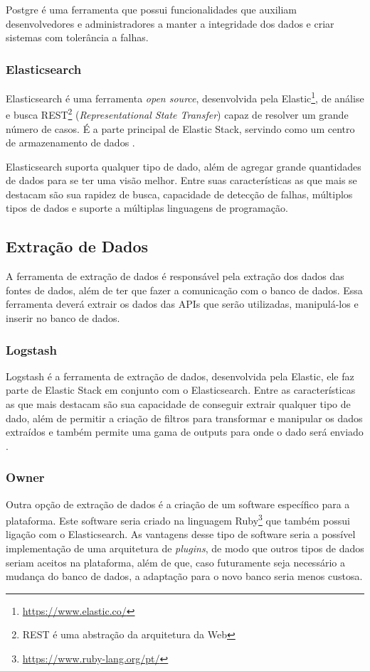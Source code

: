 Postgre é uma ferramenta que possui funcionalidades que auxiliam desenvolvedores e administradores a manter a integridade dos dados e criar sistemas com tolerância a falhas.
\subsubsection*{Elasticsearch}
Elasticsearch é uma ferramenta \textit{open source}, desenvolvida pela Elastic\footnote[2]{\url{https://www.elastic.co/}}, de análise e busca REST\footnote[3]{REST é uma abstração da arquitetura da Web} (\textit{Representational State Transfer}) capaz de resolver um grande número de casos. É a parte principal de Elastic Stack, servindo como um centro de armazenamento de dados \cite{elasticsearch}.

Elasticsearch suporta qualquer tipo de dado, além de agregar grande quantidades de dados para se ter uma visão melhor. Entre suas características as que mais se destacam são sua rapidez de busca, capacidade de detecção de falhas, múltiplos tipos de dados e suporte a múltiplas linguagens de programação.
\subsection{Extração de Dados}
A ferramenta de extração de dados é responsável pela extração dos dados das fontes de dados, além de ter que fazer a comunicação com o banco de dados. Essa ferramenta deverá extrair os dados das APIs que serão utilizadas, manipulá-los e inserir no banco de dados.
\subsubsection*{Logstash}
Logstash é a ferramenta de extração de dados, desenvolvida pela Elastic, ele faz parte de Elastic Stack em conjunto com o Elasticsearch. Entre as características as que mais destacam são sua capacidade de conseguir extrair qualquer tipo de dado, além de permitir a criação de filtros para transformar e manipular os dados extraídos e também permite uma gama de outputs para onde o dado será enviado \cite{logstash}.
\subsubsection*{Owner}
Outra opção de extração de dados é a criação de um software específico para a plataforma. Este software seria criado na linguagem Ruby\footnote[4]{\url{https://www.ruby-lang.org/pt/}} que também possui ligação com o Elasticsearch. As vantagens desse tipo de software seria a possível implementação de uma arquitetura de \textit{\textit{plugins}}, de modo que outros tipos de dados seriam aceitos na plataforma, além de que, caso futuramente seja necessário a mudança do banco de dados, a adaptação para o novo banco seria menos custosa.
